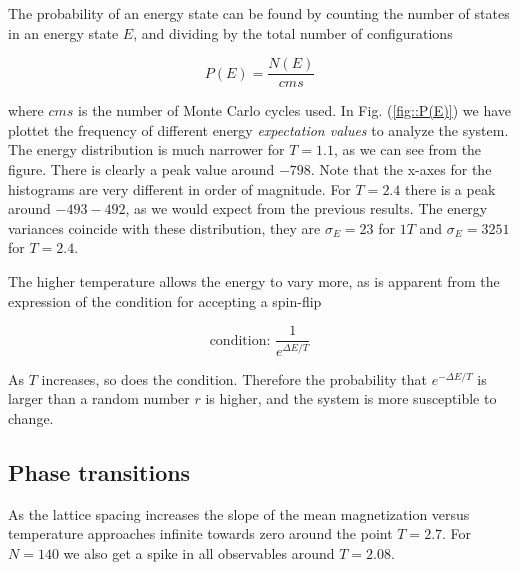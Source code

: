 \documentclass[11pt]{article}
\begin{document}
\begin{flushleft}
The probability of an energy state can be found by counting the number of states in an energy state $E$, and dividing by the total number of configurations

\begin{equation}
P(E) = \frac{N(E)}{cms}
\end{equation}

where $cms$ is the number of Monte Carlo cycles used. In  Fig. (\ref{fig::P(E)}) we have plottet the frequency of different energy \textit{expectation values} to analyze the system. The energy distribution is much narrower for $T=1.1$, as we can see from the figure. There is clearly a peak value around $-798$. Note that the x-axes for the histograms are very different in order of magnitude. For $T=2.4$ there is a peak around $-493-492$, as we would expect from the previous results. The energy variances coincide with these distribution, they are $ \sigma_E = 23$ for $1T$ and $\sigma_E = 3251$ for $T=2.4$.

\end{flushleft}

\begin{flushleft}
The higher temperature allows the energy to vary more, as is apparent from the expression of the condition for accepting a spin-flip

\begin{equation*}
\text{condition: } \frac{1}{e^{\Delta E/T}} 
\end{equation*}

As $T$ increases, so does the condition. Therefore the probability that $e^{-\Delta E/T}$ is larger than a random number $r$ is higher, and the system is more susceptible to change. 





\end{flushleft}

\subsection*{Phase transitions}

As the lattice spacing increases the slope of the mean magnetization versus temperature approaches infinite towards zero around the point $T=2.7$. For $N=140$ we also get a spike in all observables around $T=2.08$. 
\end{document}
